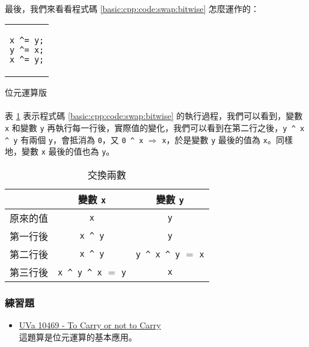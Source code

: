 \documentclass[12pt,a4paper,oneside]{article}
\begin{document}
\begin{CJK}{UTF8}{bkai}
\paragraph{}最後，我們來看看程式碼 \ref{basic:cpp:code:swap:bitwise} 怎麼運作的：

\begin{code}[h!]
\centering
\begin{tabular}{c}
\begin{lstlisting}
x ^= y;
y ^= x;
x ^= y;
\end{lstlisting}
\end{tabular}
\caption{位元運算版}
\label{basic:cpp:code:swap:bitwise}
\end{code}

\paragraph{}表 \ref{basic:cpp:table:swap:bitwise} 表示程式碼 \ref{basic:cpp:code:swap:bitwise} 的執行過程，我們可以看到，變數 \lstinline!x! 和變數 \lstinline!y! 再執行每一行後，實際值的變化，我們可以看到在第二行之後，\lstinline!y ^ x ^ y! 有兩個 \lstinline!y!，會抵消為 \lstinline!0!，又 \lstinline!0 ^ x! $\Rightarrow$ \lstinline!x!，於是變數 \lstinline!y! 最後的值為 \lstinline!x!。同樣地，變數 \lstinline!x! 最後的值也為 \lstinline!y!。

\begin{table}[h!]
\centering
\begin{tabular}{c|c|c}
 & 變數 \lstinline!x! & 變數 \lstinline!y!\\
\hline\hline
原來的值 & \lstinline!x! & \lstinline!y! \\
\hline
第一行後 & \lstinline!x ^ y! & \lstinline!y! \\
\hline
第二行後 & \lstinline!x ^ y! & \lstinline!y ^ x ^ y! $=$ \lstinline!x!\\
\hline
第三行後 & \lstinline!x ^ y ^ x! $=$ \lstinline!y! & \lstinline!x!\\
\end{tabular}
\caption{交換兩數}
\label{basic:cpp:table:swap:bitwise}
\end{table}

\subsubsection*{練習題}
\begin{itemize}
\item \label{basic:cpp:problem:uva:10469} \href{http://pcshic.github.io/uniDog/problem/p10469/}{UVa 10469 - To Carry or not to Carry}\\這題算是位元運算的基本應用。
\end{itemize}


\end{CJK}
\end{document}
